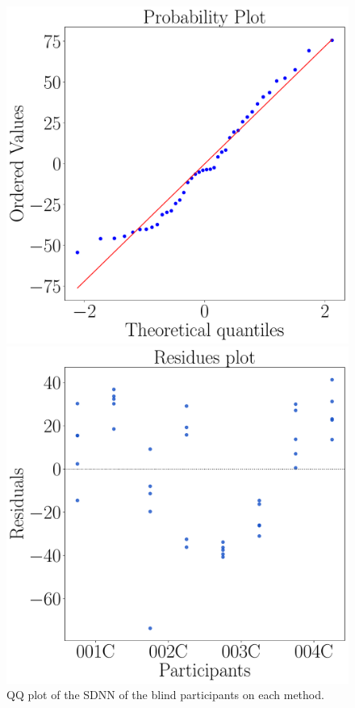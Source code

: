 \begin{figure}[!htb]
    \centering
    \begin{minipage}{0.45\textwidth}
        \centering
        \includegraphics[width = \textwidth]{Resultados/ECG/Figuras/pdf/qqplot_sdnn_two_way_blind.pdf}
        \caption{QQ plot of the SDNN of the blind participants on each method.}
        \label{fig:qqplot_sdnn_two_way_blind}
    \end{minipage}
    \begin{minipage}{0.075\textwidth}
        \hfill
    \end{minipage}
    \begin{minipage}{0.45\textwidth}
        \centering
        \includegraphics[width = \textwidth]{Resultados/ECG/Figuras/pdf/residplot_sdnn_two_way_blind.pdf}

\end{minipage}
\end{figure}
